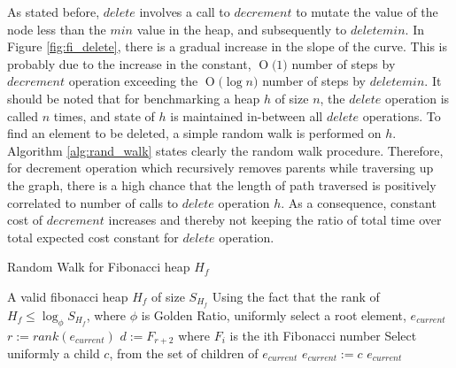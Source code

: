 \documentclass{llncs}
\newcommand{\BigO}[1]{\ensuremath{\operatorname{O}\bigl(#1\bigr)}}
\begin{document}
As stated before, $delete$ involves a call to $decrement$ to mutate the value of the node less than the $min$ value in the heap, and subsequently to $deletemin$. In Figure \ref{fig:fi_delete}, there is a gradual increase in the slope of the curve. This is probably due to the increase in the constant, \BigO{1} number of steps by $decrement$ operation exceeding the \BigO{\log n} number of steps by $deletemin$. It should be noted that for benchmarking a heap $h$ of size $n$, the $delete$ operation is called $n$ times, and state of $h$ is maintained in-between all $delete$ operations. To find an element to be deleted, a simple random walk is performed on $h$. Algorithm \ref{alg:rand_walk} states clearly the random walk procedure. Therefore, for decrement operation which recursively removes parents while traversing up the graph, there is a high chance that the length of path traversed is positively correlated to number of calls to $delete$ operation $h$. As a consequence, constant cost of $decrement$ increases and thereby not keeping the ratio of total time over total expected cost constant for $delete$ operation.

\begin{algorithm}[!ht]
	\caption{Random Walk for Fibonacci heap $H_f$}
	\label{alg:rand_walk}
	\begin{algorithmic}[1]
		\REQUIRE A valid fibonacci heap $H_f$ of size $S_{H_f}$
		\STATE Using the fact that the rank of $H_f \le \log_{\phi}S_{H_f}$, where $\phi$ is Golden Ratio\cite{dunlap1997golden}, uniformly select a root element, $e_{current}$
		\STATE $r:=rank(e_{current})$ 
		\STATE $d:=F_{r+2}$ where $F_i$ is the ith Fibonacci number
		\STATE Select uniformly a child $c$, from the set of children of $e_{current}$
		\STATE $e_{current}:=c$
		\ENDWHILE
		\RETURN $e_{current}$
	\end{algorithmic}
\end{algorithm}
\end{document}
